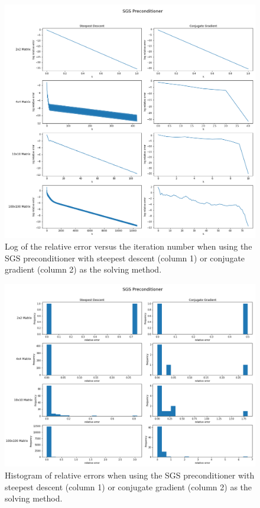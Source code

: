 \documentclass[11pt]{article}
\begin{document}
\begin{figure}[h!]
	\hspace*{-3cm}
	\centering
	\includegraphics[width=1.3\linewidth]{../figures/Log SGS Preconditioner}
	\caption{Log of the relative error versus the iteration number when using the SGS preconditioner with steepest descent (column 1) or conjugate gradient (column 2) as the solving method.}
	\label{fig:LogSGS}
\end{figure}

\begin{figure}[h!]
	\hspace*{-3cm}
	\centering
	\includegraphics[width=1.3\linewidth]{../figures/SGS Preconditioner Histogram}
	\caption{Histogram of relative errors when using the SGS preconditioner with steepest descent (column 1) or conjugate gradient (column 2) as the solving method.}
	\label{fig:HistSGS}
\end{figure}
\clearpage
\end{document}

